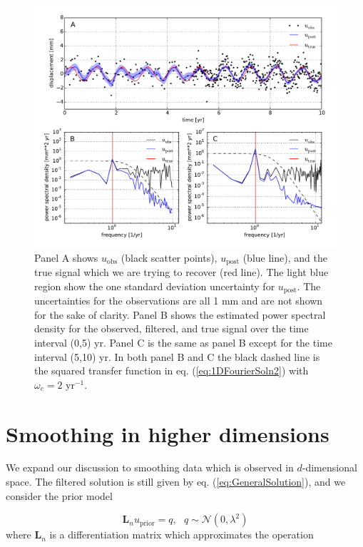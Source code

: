 \documentclass[10pt,a4paper]{article}
\begin{document}
\begin{figure}
\includegraphics[scale=0.7]{figures/fig2}
\caption{Panel A shows $u_\mathrm{obs}$ (black scatter points), $u_\mathrm{post}$ (blue line), and the true signal which we are trying to recover (red line).  The light blue region show the one standard deviation uncertainty for $u_\mathrm{post}$. The uncertainties for the observations are all 1 mm and are not shown for the sake of clarity.  Panel B shows the estimated power spectral density for the observed, filtered, and true signal over the time interval (0,5) yr. Panel C is the same as panel B except for the time interval (5,10) yr.  In both panel B and C the black dashed line is the squared transfer function in eq. (\ref{eq:1DFourierSoln2}) with $\omega_c=2$ yr$^{-1}$.}   
\label{fig:Demo2}
\end{figure}

\section*{Smoothing in higher dimensions} 
We expand our discussion to smoothing data which is observed in $d$-dimensional space.  The filtered solution is still given by eq. (\ref{eq:GeneralSolution}), and we consider the prior model

\begin{equation}
  \mathbf{L}_n u_\mathrm{prior} = q, \ \ \ q \sim \mathcal{N}(0,\lambda^2)
\end{equation}  
where $\mathbf{L}_n$ is a differentiation matrix which approximates the operation 
\end{document}
